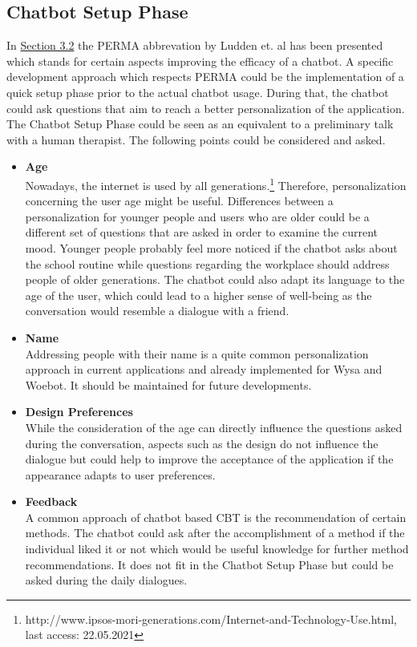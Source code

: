 \documentclass[sigconf, nonacm]{acmart}
\begin{document}
\subsection{Chatbot Setup Phase}
\label{sec:four_two}
In \hyperref[sec:three_two]{Section 3.2} the PERMA abbrevation by Ludden et. al \cite{Ludden2015} has been presented which stands for certain aspects improving the efficacy of a chatbot. A specific development approach which respects PERMA could be the implementation of a quick setup phase prior to the actual chatbot usage.
During that, the chatbot could ask questions that aim to reach a better personalization of the application. The Chatbot Setup Phase could be seen as an equivalent to a preliminary talk with a human therapist. The following points could be considered and asked.
\\
\begin{itemize}
\item\textbf{Age}\\ 
Nowadays, the internet is used by all generations.\footnote{http://www.ipsos-mori-generations.com/Internet-and-Technology-Use.html, last access: 22.05.2021}
Therefore, personalization concerning the user age might be useful. Differences between a personalization for younger people and users who are older could be a different set of questions that are asked in order to examine the current mood.
Younger people probably feel more noticed if the chatbot asks about the school routine while questions regarding the workplace should address people of older generations.
The chatbot could also adapt its language to the age of the user, which could lead to a higher sense of well-being as the conversation would resemble a dialogue with a friend. 
\\
\item\textbf{Name}\\
Addressing people with their name is a quite common personalization approach in current applications and already implemented for Wysa and Woebot. It should be maintained for future developments.
\\
\item\textbf{Design Preferences}\\
While the consideration of the age can directly influence the questions asked during the conversation, aspects such as the design do not influence the dialogue but could help to improve the acceptance of the application if the appearance adapts to user preferences. 
\\
\item\textbf{Feedback}\\
A common approach of chatbot based CBT is the recommendation of certain methods. The chatbot could ask after the accomplishment of a method if the individual liked it or not which would be useful knowledge for further method recommendations. It does not fit in the Chatbot Setup Phase but could
be asked during the daily dialogues.
\\
\end{itemize} 
\end{document}
